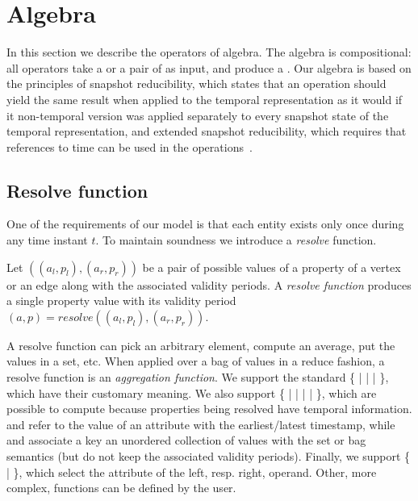 \section{Algebra}
\label{sec:algebra}
\setlength{\textfloatsep}{5pt}%

In this section we describe the operators of \tg algebra.  The algebra
is compositional: all operators take a \tg or a pair of \tgs as input,
and produce a \tg.  Our algebra is based on the principles of snapshot
reducibility, which states that an operation should yield the same
result when applied to the temporal representation as it would if it
non-temporal version was applied separately to every snapshot state of
the temporal representation, and extended snapshot reducibility, which
requires that references to time can be used in the
operations~\cite{Dignos2012}.


\subsection{Resolve function}
\label{sec:algebra:integrity}

One of the requirements of our model is that each entity exists only
once during any time instant $t$.  To maintain soundness we introduce
a {\em resolve} function.

\begin{definition}
Let $((a_l,p_l),(a_r,p_r))$ be a pair of possible values of a property
of a vertex or an edge along with the associated validity periods.  A
{\em resolve function} produces a single property value with its
validity period $(a,p) = resolve((a_l,p_l), (a_r,p_r))$.
\end{definition}

A resolve function can pick an arbitrary element, compute an average,
put the values in a set, etc.  When applied over a bag of values in a
reduce fashion, a resolve function is an {\em aggregation function}.
We support the standard \{  |  |  |
 \}, which have their customary meaning.  We also support
\{  |  |  |  |
 \}, which are possible to compute because properties being
resolved have temporal information.   and 
refer to the value of an attribute with the earliest/latest timestamp,
while  and  associate a key an unordered
collection of values with the set or bag semantics (but do not keep
the associated validity periods).  Finally, we support \{ 
|  \}, which select the attribute of the left,
resp. right, operand.  Other, more complex, functions can be defined
by the user.

